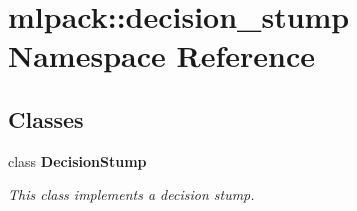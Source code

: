 \section{mlpack\+:\+:decision\+\_\+stump Namespace Reference}
\label{namespacemlpack_1_1decision__stump}
\subsection*{Classes}
\begin{DoxyCompactItemize}
\item 
class {\bf Decision\+Stump}
\begin{DoxyCompactList}\small\item\em This class implements a decision stump. \end{DoxyCompactList}\end{DoxyCompactItemize}

